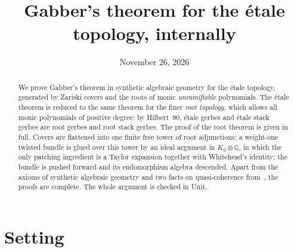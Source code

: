 \documentclass[11pt]{amsart}
\title{Gabber's theorem for the \'etale topology, internally}
\date{November 26, 2026}
\theoremstyle{definition}
\theoremstyle{remark}
\newcommand{\Q}{\mathbb Q}
\begin{document}
\begin{abstract}
We prove Gabber's theorem in synthetic algebraic geometry for the \'etale
topology, generated by Zariski covers and the roots of monic
\emph{unramifiable} polynomials. The \'etale theorem is reduced to the
same theorem for the finer \emph{root topology}, which allows all monic
polynomials of positive degree: by Hilbert~90, \'etale gerbes and \'etale
stack gerbes are root gerbes and root stack gerbes. The proof of the root
theorem is given in full. Covers are flattened into one finite free tower
of root adjunctions; a weight-one twisted bundle is glued over this tower
by an ideal argument in $K_0\otimes\Q$, in which the only patching
ingredient is a Taylor expansion together with Whitehead's identity; the
bundle is pushed forward and its endomorphism algebra descended. Apart
from the axioms of synthetic algebraic geometry and two facts on
quasi-coherence from~\cite{CCH}, the proofs are complete. The whole
argument is checked in Unit.
\end{abstract}
\maketitle

\tableofcontents

\section{Setting}
\end{document}
